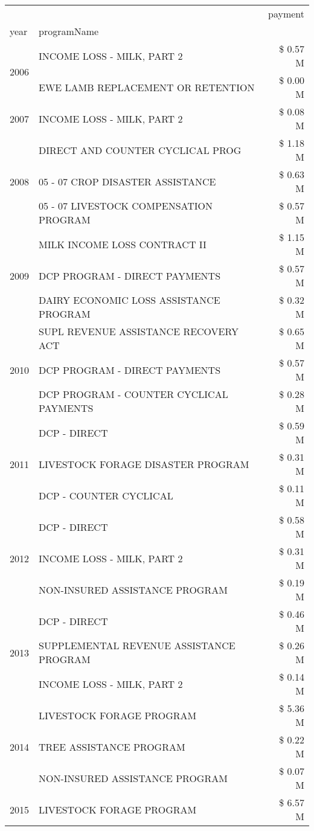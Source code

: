 \begin{tabular}{llr}
\toprule
 &  & payment \\
year & programName &  \\
\midrule
\multirow[t]{2}{*}{2006} & INCOME LOSS - MILK, PART 2 & \$ 0.57 M \\
 & EWE LAMB REPLACEMENT OR RETENTION & \$ 0.00 M \\
\cline{1-3}
2007 & INCOME LOSS - MILK, PART 2 & \$ 0.08 M \\
\cline{1-3}
\multirow[t]{3}{*}{2008} & DIRECT AND COUNTER CYCLICAL PROG & \$ 1.18 M \\
 & 05 - 07 CROP DISASTER ASSISTANCE & \$ 0.63 M \\
 & 05 - 07 LIVESTOCK COMPENSATION PROGRAM & \$ 0.57 M \\
\cline{1-3}
\multirow[t]{3}{*}{2009} & MILK INCOME LOSS CONTRACT II & \$ 1.15 M \\
 & DCP PROGRAM - DIRECT PAYMENTS & \$ 0.57 M \\
 & DAIRY ECONOMIC LOSS ASSISTANCE PROGRAM & \$ 0.32 M \\
\cline{1-3}
\multirow[t]{3}{*}{2010} & SUPL REVENUE ASSISTANCE RECOVERY ACT & \$ 0.65 M \\
 & DCP PROGRAM - DIRECT PAYMENTS & \$ 0.57 M \\
 & DCP PROGRAM - COUNTER CYCLICAL PAYMENTS & \$ 0.28 M \\
\cline{1-3}
\multirow[t]{3}{*}{2011} & DCP - DIRECT & \$ 0.59 M \\
 & LIVESTOCK FORAGE DISASTER PROGRAM & \$ 0.31 M \\
 & DCP - COUNTER CYCLICAL & \$ 0.11 M \\
\cline{1-3}
\multirow[t]{3}{*}{2012} & DCP - DIRECT & \$ 0.58 M \\
 & INCOME LOSS - MILK, PART 2 & \$ 0.31 M \\
 & NON-INSURED ASSISTANCE PROGRAM & \$ 0.19 M \\
\cline{1-3}
\multirow[t]{3}{*}{2013} & DCP - DIRECT & \$ 0.46 M \\
 & SUPPLEMENTAL REVENUE ASSISTANCE PROGRAM & \$ 0.26 M \\
 & INCOME LOSS - MILK, PART 2 & \$ 0.14 M \\
\cline{1-3}
\multirow[t]{3}{*}{2014} & LIVESTOCK FORAGE PROGRAM & \$ 5.36 M \\
 & TREE ASSISTANCE PROGRAM & \$ 0.22 M \\
 & NON-INSURED ASSISTANCE PROGRAM & \$ 0.07 M \\
\cline{1-3}
\multirow[t]{3}{*}{2015} & LIVESTOCK FORAGE PROGRAM & \$ 6.57 M \\

\end{tabular}
